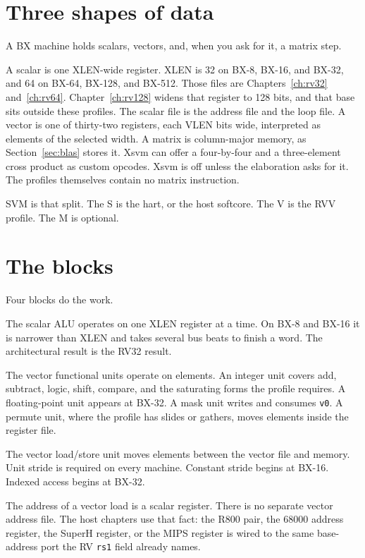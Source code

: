 \section{Three shapes of data}

A BX machine holds scalars, vectors, and, when you ask for it, a matrix step.

A scalar is one XLEN-wide register. XLEN is 32 on BX-8, BX-16, and BX-32, and 64 on BX-64, BX-128, and BX-512. Those files are Chapters~\ref{ch:rv32} and~\ref{ch:rv64}. Chapter~\ref{ch:rv128} widens that register to 128 bits, and that base sits outside these profiles. The scalar file is the address file and the loop file. A vector is one of thirty-two registers, each VLEN bits wide, interpreted as elements of the selected width. A matrix is column-major memory, as Section~\ref{sec:blas} stores it. Xsvm can offer a four-by-four and a three-element cross product as custom opcodes. Xsvm is off unless the elaboration asks for it. The profiles themselves contain no matrix instruction.

SVM is that split. The S is the hart, or the host softcore. The V is the RVV profile. The M is optional.

\section{The blocks}

Four blocks do the work.

The scalar ALU operates on one XLEN register at a time. On BX-8 and BX-16 it is narrower than XLEN and takes several bus beats to finish a word. The architectural result is the RV32 result.

The vector functional units operate on elements. An integer unit covers add, subtract, logic, shift, compare, and the saturating forms the profile requires. A floating-point unit appears at BX-32. A mask unit writes and consumes \texttt{v0}. A permute unit, where the profile has slides or gathers, moves elements inside the register file.

The vector load/store unit moves elements between the vector file and memory. Unit stride is required on every machine. Constant stride begins at BX-16. Indexed access begins at BX-32.

The address of a vector load is a scalar register. There is no separate vector address file. The host chapters use that fact: the R800 pair, the 68000 address register, the SuperH register, or the MIPS register is wired to the same base-address port the RV \texttt{rs1} field already names.

